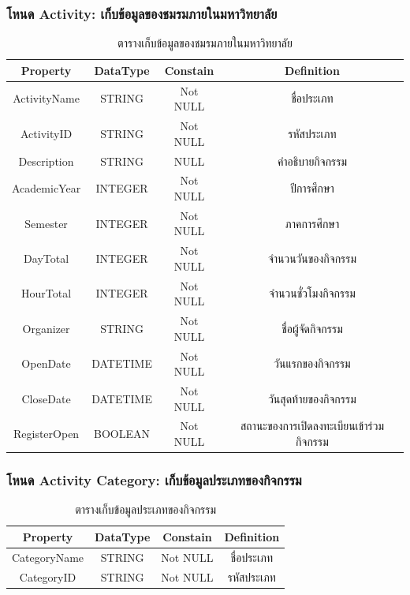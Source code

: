 \documentclass[14pt,oneside,openright,a4paper]{cpe-thai-project}
\begin{document}
    \subsubsection{โหนด Activity: เก็บข้อมูลของชมรมภายในมหาวิทยาลัย}
    \begin{table}[!h]\centering
      \begin{tabular}{|c|c|c|c|}
      \hline
      \rowcolor[HTML]{9FC5E8} 
      Property     & DataType & Constain & Definition                              \\ \hline
      ActivityName & STRING   & Not NULL & ชื่อประเภท                              \\ \hline
      ActivityID   & STRING   & Not NULL & รหัสประเภท                              \\ \hline
      Description  & STRING   & NULL     & คำอธิบายกิจกรรม                         \\ \hline
      AcademicYear & INTEGER  & Not NULL & ปีการศึกษา                              \\ \hline
      Semester     & INTEGER  & Not NULL & ภาคการศึกษา                             \\ \hline
      DayTotal     & INTEGER  & Not NULL & จำนวนวันของกิจกรรม                      \\ \hline
      HourTotal    & INTEGER  & Not NULL & จำนวนชั่วโมงกิจกรรม                     \\ \hline
      Organizer    & STRING   & Not NULL & ชื่อผู้จัดกิจกรรม                       \\ \hline
      OpenDate     & DATETIME & Not NULL & วันแรกของกิจกรรม                        \\ \hline
      CloseDate    & DATETIME & Not NULL & วันสุดท้ายของกิจกรรม                    \\ \hline
      RegisterOpen & BOOLEAN  & Not NULL & สถานะของการเปิดลงทะเบียนเข้าร่วมกิจกรรม \\ \hline
      \end{tabular}
      \caption{\centering ตารางเก็บข้อมูลของชมรมภายในมหาวิทยาลัย}\label{tab:Activitynode}
    \end{table}
    
    \subsubsection{โหนด Activity Category: เก็บข้อมูลประเภทของกิจกรรม}
    \begin{table}[!h]\centering
      \begin{tabular}{|c|c|c|c|}
      \hline
      \rowcolor[HTML]{9FC5E8} 
      Property     & DataType & Constain & Definition \\ \hline
      CategoryName & STRING   & Not NULL & ชื่อประเภท \\ \hline
      CategoryID   & STRING   & Not NULL & รหัสประเภท \\ \hline
      \end{tabular}
      \caption{\centering ตารางเก็บข้อมูลประเภทของกิจกรรม}\label{tab:Activity Category Node}
    \end{table}
\end{document}
